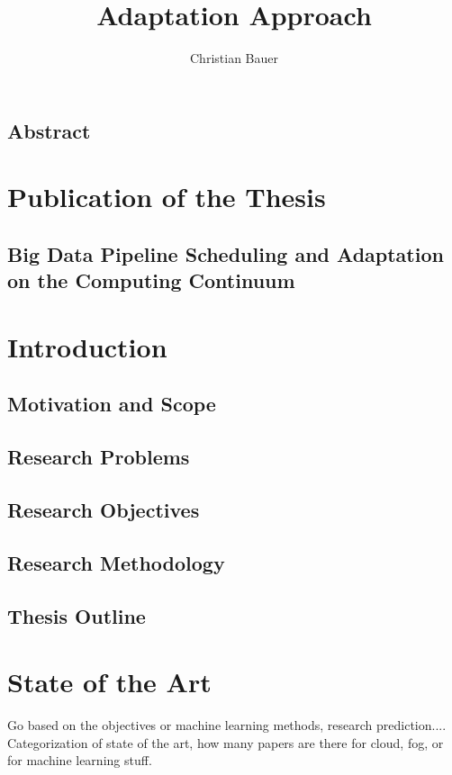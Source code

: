 \documentclass{report}
\title{Adaptation Approach}
\author{Christian Bauer}
\begin{document}
  \maketitle

  \tableofcontents

  \section*{Abstract}

  \chapter*{Publication of the Thesis}

    \section*{Big Data Pipeline Scheduling and Adaptation on the Computing Continuum}

  \chapter{Introduction}

    \section{Motivation and Scope}
    \section{Research Problems}
    \section{Research Objectives}
    \section{Research Methodology}
    \section{Thesis Outline}

  \chapter{State of the Art}

    Go based on the objectives or machine learning methods, research prediction....
    Categorization of state of the art, how many papers are there for cloud, fog, or for machine learning stuff.
\end{document}
